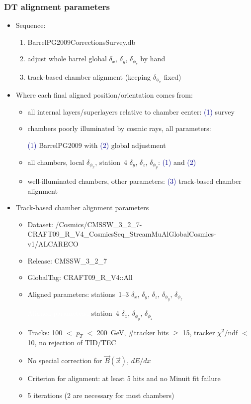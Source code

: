 \documentclass[compress]{beamer}
\begin{document}
\begin{frame}
\frametitle{DT alignment parameters}

\scriptsize
\vspace{-0.25 cm}
\begin{itemize}
\item \scriptsize Sequence:
\begin{enumerate}
\scriptsize \item \scriptsize BarrelPG2009CorrectionsSurvey.db
\item \scriptsize adjust whole barrel global $\delta_x$, $\delta_y$, $\delta_{\phi_z}$ by hand
\item \scriptsize track-based chamber alignment (keeping $\delta_{\phi_x}$ fixed)
\end{enumerate}
\item \scriptsize Where each final aligned position/orientation comes from:
\begin{itemize}
\item \scriptsize all internal layers/superlayers relative to chamber center: \textcolor{darkblue}{(1)} survey
\item \scriptsize chambers poorly illuminated by cosmic rays, all parameters:

\textcolor{darkblue}{(1)} BarrelPG2009 with \textcolor{darkblue}{(2)} global adjustment
\item \scriptsize all chambers, local $\delta_{\phi_x}$, station~4 $\delta_y$, $\delta_z$, $\delta_{\phi_y}$: \textcolor{darkblue}{(1)} and \textcolor{darkblue}{(2)}
\item \scriptsize well-illuminated chambers, other parameters: \textcolor{darkblue}{(3)} track-based chamber alignment
\end{itemize}
\item \scriptsize Track-based chamber alignment parameters
\begin{itemize}
\item \scriptsize Dataset: {\scriptsize /Cosmics/CMSSW\_3\_2\_7-CRAFT09\_R\_V4\_CosmicsSeq\_StreamMuAlGlobalCosmics-v1/ALCARECO}
\item \scriptsize Release: CMSSW\_3\_2\_7
\item \scriptsize GlobalTag: CRAFT09\_R\_V4::All
\item \scriptsize Aligned parameters: stations~1--3 $\delta_x$, $\delta_y$, $\delta_z$, $\delta_{\phi_y}$, $\delta_{\phi_z}$

\textcolor{white}{Aligned parameters:} station~4 $\delta_x$, $\delta_{\phi_y}$, $\delta_{\phi_z}$
\item \scriptsize Tracks: 100 $<$ $p_T$ $<$ 200~GeV, \#tracker hits $\ge$ 15, tracker $\chi^2/\mbox{ndf}$ $<$ 10, no rejection of TID/TEC
\item \scriptsize No special correction for $\vec{B}(\vec{x})$, $dE/dx$
\item \scriptsize Criterion for alignment: at least 5 hits and no Minuit fit failure
\item \scriptsize 5 iterations (2 are necessary for most chambers)
\end{itemize}
\end{itemize}
\end{frame}
\end{document}
